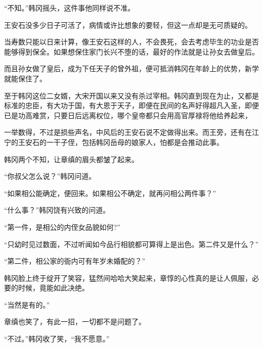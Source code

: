 “不知。”韩冈摇头，这件事他同样说不准。

王安石没多少日子可活了，病情或许比想象的要轻，但这一点却是无可质疑的。

当寿数只能以日来计算，像王安石这样的人，不会畏死，会去考虑毕生的功业是否能够得到保全。如果想保住家门长兴不堕的话，最好的作法就是让孙女去做皇后。

而且孙女做了皇后，成为下任天子的曾外祖，便可抵消韩冈在年龄上的优势，新学就能保住了。

至于韩冈这位二女婿，大宋开国以来又没有杀过宰相。韩冈直到现在为止，又都是标准的忠臣，有大功于国，有大恩于天子，即便在民间的名声好得超凡入圣，即便已是功高难赏，只要日后远离权位，哪个皇帝都只会用高官厚禄将他给养起来，

一举数得，不过是损些声名，中风后的王安石说不定做得出来。而王旁，还有在江宁的王安石的一干子侄，包括韩冈岳母的娘家人，怕都是会推动此事。

韩冈两个不知，让章缜的眉头都皱了起来。

“你叔父怎么说？”韩冈问道。

“如果相公能确定，便回来。如果相公不确定，就再问相公两件事？”

“什么事？”韩冈饶有兴致的问道。

“第一件，是相公的内侄女品貌如何?”

“只幼时见过数面，不过听闻如今品行相貌都可算得上是出色。第二件又是什么？”

“第二件，相公家的衙内可有年岁未婚配的？”

韩冈脸上终于绽开了笑容，猛然间哈哈大笑起来，章惇的心性真的是让人佩服，必要的时候，竟能如此决绝。

“当然是有的。”

章缜也笑了，有此一招，一切都不是问题了。

“不过。”韩冈收了笑，“我不愿意。”
